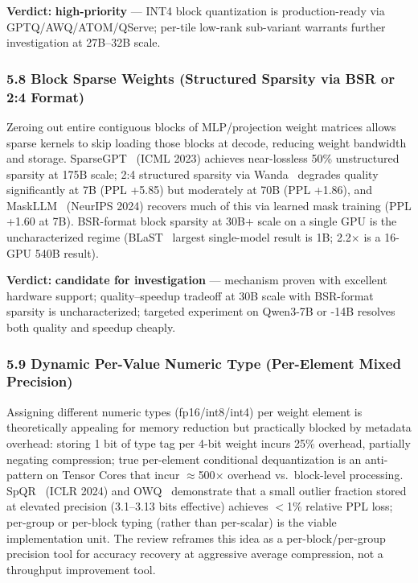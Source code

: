 \documentclass[11pt]{article}
\begin{document}
\textbf{Verdict:} \textbf{high-priority} --- INT4 block quantization is production-ready via GPTQ/AWQ/ATOM/QServe; per-tile low-rank sub-variant warrants further investigation at 27B--32B scale.

\subsubsection{5.8 Block Sparse Weights (Structured Sparsity via BSR or 2:4 Format)}
\label{sec:idea_5_8}

Zeroing out entire contiguous blocks of MLP/projection weight matrices allows sparse kernels to skip loading those blocks at decode, reducing weight bandwidth and storage.
SparseGPT~\cite{Frantar2023SparseGPT} (ICML 2023) achieves near-lossless 50\% unstructured sparsity at 175B scale; 2:4 structured sparsity via Wanda~\cite{Sun2024Wanda} degrades quality significantly at 7B (PPL +5.85) but moderately at 70B (PPL +1.86), and MaskLLM~\cite{Fang2024MaskLLM} (NeurIPS 2024) recovers much of this via learned mask training (PPL +1.60 at 7B).
BSR-format block sparsity at 30B+ scale on a single GPU is the uncharacterized regime (BLaST~\cite{BLaST2025} largest single-model result is 1B; 2.2$\times$ is a 16-GPU 540B result).

\textbf{Verdict:} \textbf{candidate for investigation} --- mechanism proven with excellent hardware support; quality--speedup tradeoff at 30B scale with BSR-format sparsity is uncharacterized; targeted experiment on Qwen3-7B or -14B resolves both quality and speedup cheaply.

\subsubsection{5.9 Dynamic Per-Value Numeric Type (Per-Element Mixed Precision)}
\label{sec:idea_5_9}

Assigning different numeric types (fp16/int8/int4) per weight element is theoretically appealing for memory reduction but practically blocked by metadata overhead: storing 1 bit of type tag per 4-bit weight incurs 25\% overhead, partially negating compression; true per-element conditional dequantization is an anti-pattern on Tensor Cores that incur $\approx$500$\times$ overhead vs.\ block-level processing.
SpQR~\cite{Dettmers2023SpQR} (ICLR 2024) and OWQ~\cite{Lee2023OWQ} demonstrate that a small outlier fraction stored at elevated precision (3.1--3.13 bits effective) achieves $<$1\% relative PPL loss; per-group or per-block typing (rather than per-scalar) is the viable implementation unit.
The review reframes this idea as a per-block/per-group precision tool for accuracy recovery at aggressive average compression, not a throughput improvement tool.
\end{document}
